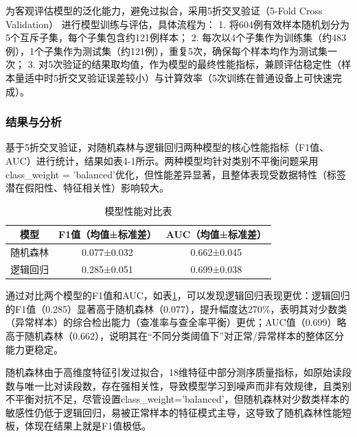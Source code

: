 \documentclass[withoutpreface,bwprint]{cumcmthesis} %
\begin{document}
为客观评估模型的泛化能力，避免过拟合，采用5折交叉验证（5-Fold Cross Validation） 进行模型训练与评估，具体流程为：  
1. 将604例有效样本随机划分为5个互斥子集，每个子集包含约121例样本；  
2. 每次以4个子集作为训练集（约483例），1个子集作为测试集（约121例），重复5次，确保每个样本均作为测试集一次；  
3. 对5次验证的结果取均值，作为模型的最终性能指标，兼顾评估稳定性（样本量适中时5折交叉验证误差较小）与计算效率（5次训练在普通设备上可快速完成）。


\subsubsection{结果与分析}

基于5折交叉验证，对随机森林与逻辑回归两种模型的核心性能指标（F1值、AUC）进行统计，结果如表4-1所示。两种模型均针对类别不平衡问题采用class\_weight = 'balanced'优化，但性能差异显著，且整体表现受数据特性（标签潜在假阳性、特征相关性）影响较大。


\begin{table}[H]
    \centering  %
    \caption{模型性能对比表}  %
    \label{tab:模型性能对比表}  %
    \begin{threeparttable}
        \begin{tabularx}{0.75\textwidth}{c c c}
            \toprule[1.5pt]
            \textbf{模型} & \textbf{F1值（均值±标准差）} & \textbf{AUC（均值±标准差）} \\ 
            \midrule[1pt]
            随机森林 & 0.077±0.032 & 0.662±0.045 \\
            逻辑回归 & 0.285±0.051 & 0.699±0.038 \\

            \bottomrule[1.5pt]
        
        \end{tabularx}
    \end{threeparttable}
\end{table}

通过对比两个模型的F1值和AUC，如表\ref{tab:模型性能对比表}，可以发现逻辑回归表现更优：逻辑回归的F1值（0.285）显著高于随机森林（0.077），提升幅度达270\%，表明其对少数类（异常样本）的综合检出能力（查准率与查全率平衡）更优；AUC值（0.699）略高于随机森林（0.662），说明其在“不同分类阈值下”对正常/异常样本的整体区分能力更稳定。  

随机森林由于高维度特征引发过拟合，18维特征中部分测序质量指标，如原始读段数与唯一比对读段数，存在强相关性，导致模型学习到噪声而非有效规律，且类别不平衡对抗不足，尽管设置class\_weight='balanced'，但随机森林对少数类样本的敏感性仍低于逻辑回归，易被正常样本的特征模式主导，这导致了随机森林性能短板，体现在结果上就是F1值极低。
\end{document}
